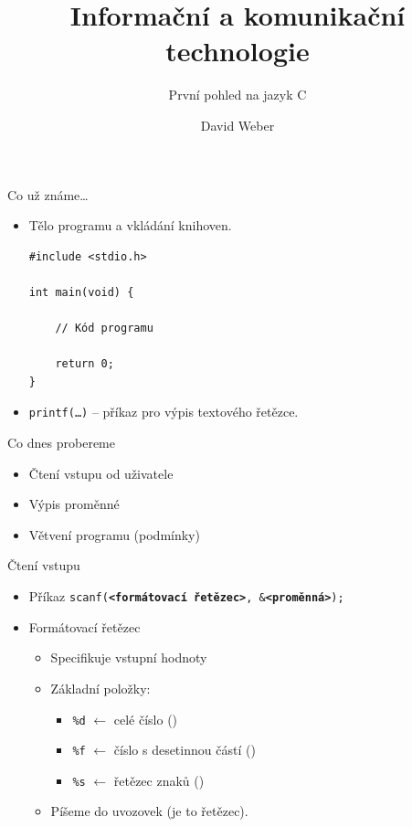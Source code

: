 \documentclass[14pt]{beamer}
\title{Informační a komunikační technologie}
\subtitle{První pohled na jazyk C}
\author{David Weber}
\begin{document}

    \begin{frame}
        \titlepage
    \end{frame}

    \begin{frame}[t,fragile]{Co už známe\dots}
        \begin{itemize}
            \item Tělo programu a vkládání knihoven.
            \begin{lstlisting}
#include <stdio.h>

int main(void) {

    // Kód programu

    return 0;
}
            \end{lstlisting}
            \item \texttt{printf(\dots)} -- příkaz pro výpis textového řetězce.
        \end{itemize}
    \end{frame}

    \begin{frame}[t]{Co dnes probereme}
        \begin{itemize}
            \item Čtení vstupu od uživatele
            \item Výpis proměnné
            \item Větvení programu (podmínky)
        \end{itemize}
    \end{frame}

    \begin{frame}[t]{Čtení vstupu}
        \begin{itemize}
            \item Příkaz \texttt{scanf(\textbf{<formátovací řetězec>}, \&\textbf{<proměnná>});}
            \item Formátovací řetězec
            \begin{itemize}
                \item Specifikuje  vstupní hodnoty
                \item Základní položky:
                \begin{itemize}
                    \item \texttt{\%d} $\leftarrow$ celé číslo ()
                    \item \texttt{\%f} $\leftarrow$ číslo s desetinnou částí ()
                    \item \texttt{\%s} $\leftarrow$ řetězec znaků ()
                \end{itemize}
                \item Píšeme do uvozovek \textquotedbl{} \textquotedbl (je to řetězec).
            \end{itemize}
        \end{itemize}
    \end{frame}
\end{document}

